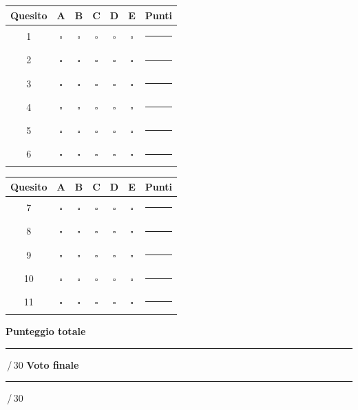 \documentclass[11pt,a4paper]{article}
\begin{document}
\vspace{0.8em}
\noindent
\begin{minipage}[t]{0.48\linewidth}
    \begin{tabular}{c*{5}{c}c}
        \toprule
        Quesito & A & B & C & D & E & Punti\\
        \midrule
        1 & $\square$ & $\square$ & $\square$ & $\square$ & $\square$ & \rule{0.45cm}{0.4pt}\\
        2 & $\square$ & $\square$ & $\square$ & $\square$ & $\square$ & \rule{0.45cm}{0.4pt}\\
        3 & $\square$ & $\square$ & $\square$ & $\square$ & $\square$ & \rule{0.45cm}{0.4pt}\\
        4 & $\square$ & $\square$ & $\square$ & $\square$ & $\square$ & \rule{0.45cm}{0.4pt}\\
        5 & $\square$ & $\square$ & $\square$ & $\square$ & $\square$ & \rule{0.45cm}{0.4pt}\\
        6 & $\square$ & $\square$ & $\square$ & $\square$ & $\square$ & \rule{0.45cm}{0.4pt}\\
        \bottomrule
    \end{tabular}
\end{minipage}\hfill
\begin{minipage}[t]{0.48\linewidth}
    \begin{tabular}{c*{5}{c}c}
        \toprule
        Quesito & A & B & C & D & E & Punti\\
        \midrule
        7 & $\square$ & $\square$ & $\square$ & $\square$ & $\square$ & \rule{0.45cm}{0.4pt}\\
        8 & $\square$ & $\square$ & $\square$ & $\square$ & $\square$ & \rule{0.45cm}{0.4pt}\\
        9 & $\square$ & $\square$ & $\square$ & $\square$ & $\square$ & \rule{0.45cm}{0.4pt}\\
        10 & $\square$ & $\square$ & $\square$ & $\square$ & $\square$ & \rule{0.45cm}{0.4pt}\\
        11 & $\square$ & $\square$ & $\square$ & $\square$ & $\square$ & \rule{0.45cm}{0.4pt}\\
        \bottomrule
    \end{tabular}
\end{minipage}

\vspace{2em}
\noindent
\colorbox{examPale}{%
    \parbox{\dimexpr\linewidth-2\fboxsep\relax}{%
        \textbf{Punteggio totale} \hfill
        \rule{1.5cm}{0.4pt}\,/\,30
        \hspace{1.5em}
        \textbf{Voto finale} \hfill
        \rule{1.5cm}{0.4pt}\,/\,30}}
\end{document}
